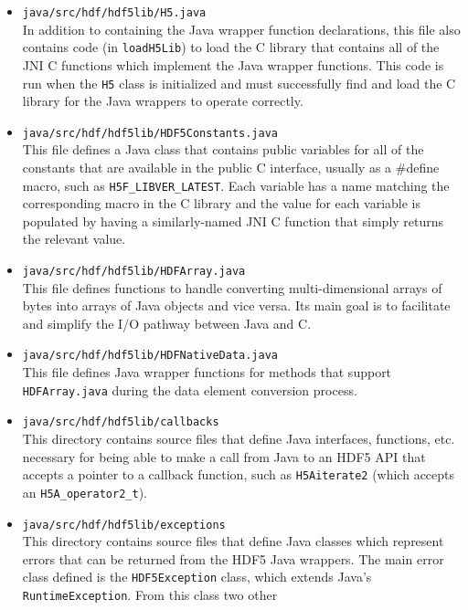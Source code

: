 \begin{itemize}
  \item \texttt{java/src/hdf/hdf5lib/H5.java} \\
    In addition to containing the Java wrapper function declarations, this file also contains
    code (in \texttt{loadH5Lib}) to load the C library that contains all of the JNI C functions
    which implement the Java wrapper functions. This code is run when the \texttt{H5} class is
    initialized and must successfully find and load the C library for the Java wrappers to
    operate correctly.
  \item \texttt{java/src/hdf/hdf5lib/HDF5Constants.java} \\
    This file defines a Java class that contains public variables for all of the constants that
    are available in the public C interface, usually as a \#define macro, such as
    \texttt{H5F\_LIBVER\_LATEST}. Each variable has a name matching the corresponding macro in
    the C library and the value for each variable is populated by having a similarly-named
    JNI C function that simply returns the relevant value.
  \item \texttt{java/src/hdf/hdf5lib/HDFArray.java} \\
    This file defines functions to handle converting multi-dimensional arrays of bytes into
    arrays of Java objects and vice versa. Its main goal is to facilitate and simplify the
    I/O pathway between Java and C.
  \item \texttt{java/src/hdf/hdf5lib/HDFNativeData.java} \\
    This file defines Java wrapper functions for methods that support \texttt{HDFArray.java}
    during the data element conversion process. 
  \item \texttt{java/src/hdf/hdf5lib/callbacks} \\
    This directory contains source files that define Java interfaces, functions, etc. necessary
    for being able to make a call from Java to an HDF5 API that accepts a pointer to a callback
    function, such as \texttt{H5Aiterate2} (which accepts an \texttt{H5A\_operator2\_t}).
  \item \texttt{java/src/hdf/hdf5lib/exceptions} \\
    This directory contains source files that define Java classes which represent errors that
    can be returned from the HDF5 Java wrappers. The main error class defined is the \texttt{HDF5Exception}
    class, which extends Java's \texttt{RuntimeException}. From this class two other

\end{itemize}
